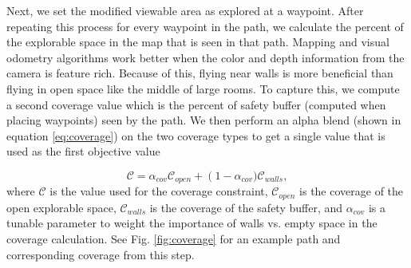 \documentclass[letterpaper, 10 pt, conference]{ieeeconf}  %
\begin{document}
 Next, we set the modified viewable area as explored at a waypoint. After repeating this process for every waypoint in the path, we calculate the percent of the explorable space in the map that is seen in that path. Mapping and visual odometry algorithms work better when the color and depth information from the camera is feature rich. Because of this, flying near walls is more beneficial than flying in open space like the middle of large rooms. To capture this, we compute a second coverage value which is the percent of safety buffer (computed when placing waypoints) seen by the path. We then perform an alpha blend (shown in equation \ref{eq:coverage}) on the two coverage types to get a single value that is used as the first objective value

\begin{equation}\label{eq:coverage}%
    \mathcal{C} = \alpha_{\mathit{cov}} \mathcal{C}_{\mathit{open}} + \left(1-\alpha_{\mathit{cov}})\right. \mathcal{C}_{\mathit{walls}},
\end{equation}
%
where $\mathcal{C}$ is the value used for the coverage constraint, $\mathcal{C}_{\mathit{open}}$ is the coverage of the open explorable space, $\mathcal{C}_{\mathit{walls}}$ is the coverage of the safety buffer, and $\alpha_{\mathit{cov}}$ is a tunable parameter to weight the importance of walls vs. empty space in the coverage calculation. See Fig. \ref{fig:coverage} for an example path and corresponding coverage from this step.
\end{document}
